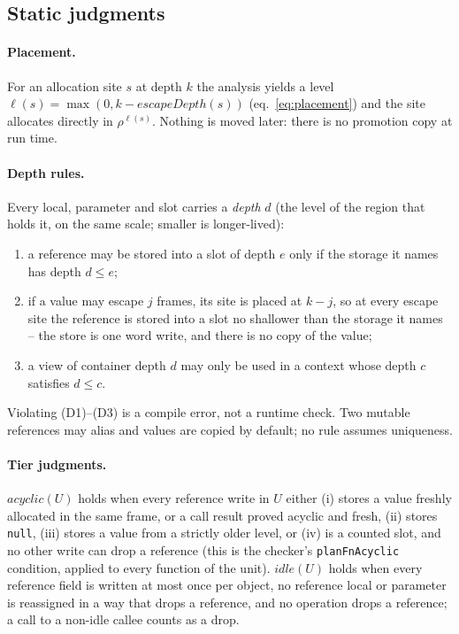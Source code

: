 \subsection{Static judgments}
\label{sec:judgments}

\paragraph{Placement.}
For an allocation site $s$ at depth $k$ the analysis yields a level
$\ell(s) = \max(0, k - \mathit{escapeDepth}(s))$ (eq.~\ref{eq:placement}) and the site allocates
directly in $\rho^{\ell(s)}$.
Nothing is moved later: there is no promotion copy at run time.

\paragraph{Depth rules.}
Every local, parameter and slot carries a \emph{depth} $d$ (the level of the region that holds it,
on the same scale; smaller is longer-lived):
\begin{enumerate}
\item[(D1)] a reference may be stored into a slot of depth $e$ only if the storage it names has
  depth $d \le e$;
\item[(D2)] if a value may escape $j$ frames, its site is placed at $k - j$, so at every escape site
  the reference is stored into a slot no shallower than the storage it names -- the store is one
  word write, and there is no copy of the value;
\item[(D3)] a view of container depth $d$ may only be used in a context whose depth $c$ satisfies
  $d \le c$.
\end{enumerate}
Violating (D1)--(D3) is a compile error, not a runtime check.
Two mutable references may alias and values are copied by default; no rule assumes uniqueness.

\paragraph{Tier judgments.}
$\mathit{acyclic}(U)$ holds when every reference write in $U$ either (i) stores a value freshly
allocated in the same frame, or a call result proved acyclic and fresh, (ii) stores \texttt{null},
(iii) stores a value from a strictly older level, or (iv) is a counted slot, and no other write can
drop a reference (this is the checker's \texttt{planFnAcyclic} condition, applied to every function
of the unit).
$\mathit{idle}(U)$ holds when every reference field is written at most once per object, no reference
local or parameter is reassigned in a way that drops a reference, and no operation drops a reference;
a call to a non-idle callee counts as a drop.

